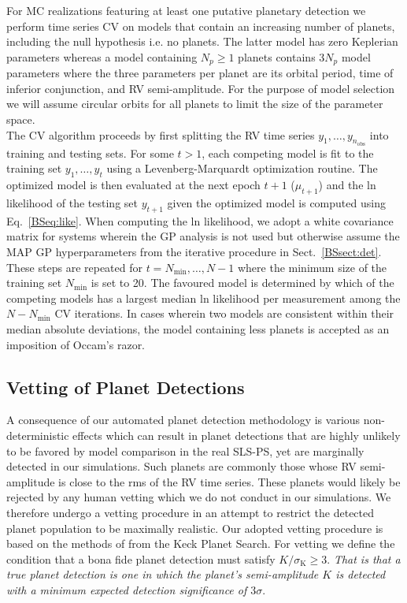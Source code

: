 For MC realizations featuring at least one putative planetary detection
we perform time series CV 
on models that contain an increasing number of planets, including the null hypothesis i.e. no planets.
The latter model has zero Keplerian parameters whereas a model containing $N_p \ge 1$ planets
contains $3N_p$ model parameters where the three parameters per planet are its orbital period,
time of inferior conjunction, and RV semi-amplitude. For the purpose of model selection we
will assume circular orbits for all planets to limit the size of the parameter space. \\

The CV algorithm proceeds by first splitting the RV time series $y_1,\dots,y_{n_{\text{obs}}}$ into training and
testing sets. For some $t>1$, each competing model is fit to the training set
$y_1,\dots,y_t$ using a Levenberg-Marquardt optimization routine. The optimized model is then evaluated
at the next epoch $t+1$ ($\mu_{t+1}$) and the ln likelihood of the testing set $y_{t+1}$ given the optimized
model is computed
using Eq.~\ref{BSeq:like}. When computing the ln likelihood, we adopt a white covariance matrix for systems
wherein the GP analysis is not used but otherwise assume the MAP GP hyperparameters from the
iterative procedure in Sect.~\ref{BSsect:det}. These steps are repeated for
$t=N_{\text{min}},\dots,N-1$ where the minimum size of the training set $N_{\text{min}}$ is set to 20. 
The favoured model is determined by which of the competing models has a largest median ln likelihood per
measurement among the $N-N_{\text{min}}$ CV iterations. In cases wherein two models are consistent
within their median absolute deviations, the model containing less planets is accepted as an imposition of
Occam's razor. \\


\subsection{Vetting of Planet Detections} \label{BSsect:vett}
A consequence of our automated planet detection methodology is
various non-deterministic effects which can result in planet detections that are highly unlikely to be
favored by model comparison in the real SLS-PS, yet are marginally detected in our simulations.
Such planets are commonly those whose RV semi-amplitude is
close to the rms of the RV time series. These planets would likely be rejected by any human
vetting which we do not conduct in our simulations. We therefore undergo a vetting procedure in an
attempt to restrict the detected planet population to be maximally realistic. Our adopted vetting procedure
is based on the methods of \cite{cumming08} from the Keck Planet Search. For vetting we define 
the condition that a bona fide planet detection must satisfy $K/\sigma_{\text{K}} \ge 3$. \emph{That is
  that a true planet detection is one in which the planet's semi-amplitude $K$ is detected with a minimum
  expected detection significance of $3\sigma$}. \\

